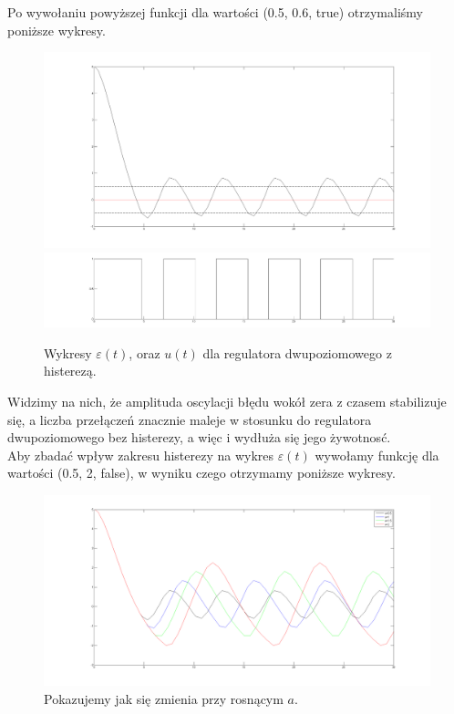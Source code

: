 \documentclass[a4paper,10pt]{article}
\begin{document}
Po wywołaniu powyższej funkcji dla wartości (0.5, 0.6, true) otrzymaliśmy poniższe wykresy.

\begin{figure}[!h]
    \centering
	\includegraphics[width=120mm]{CW3-dwupolozeniowy-e-a05.png}
	\includegraphics[width=120mm]{CW3-dwupolozeniowy-u-a05.png}
	\caption{Wykresy $\varepsilon(t)$, oraz $u(t)$ dla regulatora dwupoziomowego z histerezą.}
    \label{fig:Rysunek}
\end{figure}

Widzimy na nich, że amplituda oscylacji błędu wokół zera z czasem stabilizuje się, a liczba przełączeń znacznie maleje w stosunku do regulatora dwupoziomowego bez histerezy, a więc i wydłuża się jego żywotnosć. \\
Aby zbadać wpływ zakresu histerezy na wykres $\varepsilon(t)$ wywołamy funkcję dla wartości (0.5, 2, false), w wyniku czego otrzymamy poniższe wykresy.

\begin{figure}[!h]
    \centering
	\includegraphics[width=120mm]{CW3-dwupolozeniowy-e.png}
	\caption{Pokazujemy jak się zmienia przy rosnącym $a$.}
    \label{fig:Rysunek}
\end{figure}
\end{document}
